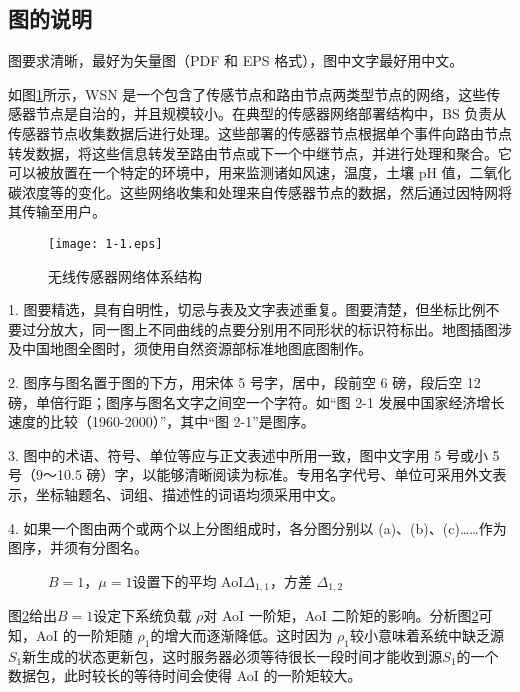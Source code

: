 \subsection{图的说明}

图要求清晰，最好为矢量图（PDF 和 EPS 格式），图中文字最好用中文。

如图\ref{Fig1-1}所示，WSN 是一个包含了传感节点和路由节点两类型节点的网络，这些传感器节点是自治的，并且规模较小。在典型的传感器网络部署结构中，BS 负责从传感器节点收集数据后进行处理。这些部署的传感器节点根据单个事件向路由节点转发数据，将这些信息转发至路由节点或下一个中继节点，并进行处理和聚合。它可以被放置在一个特定的环境中，用来监测诸如风速，温度，土壤 pH 值，二氧化碳浓度等的变化。这些网络收集和处理来自传感器节点的数据，然后通过因特网将其传输至用户。

\begin{figure}[htbp]
\vspace*{6pt}
\centering
\texttt{[image: 1-1.eps]}
\caption{无线传感器网络体系结构}\label{Fig1-1}
\vspace*{10pt}
\end{figure}


\textcolor[rgb]{1.00,0.00,0.00}{1. 图要精选，具有自明性，切忌与表及文字表述重复。图要清楚，但坐标比例不要过分放大，同一图上不同曲线的点要分别用不同形状的标识符标出。地图插图涉及中国地图全图时，须使用自然资源部标准地图底图制作。}

\textcolor[rgb]{1.00,0.00,0.00}{2. 图序与图名置于图的下方，用宋体 5 号字，居中，段前空 6 磅，段后空 12 磅，单倍行距；图序与图名文字之间空一个字符。如“图 2-1 发展中国家经济增长速度的比较（1960-2000）”，其中“图 2-1”是图序。}

\textcolor[rgb]{1.00,0.00,0.00}{3. 图中的术语、符号、单位等应与正文表述中所用一致，图中文字用 5 号或小 5 号（9～10.5 磅）字，以能够清晰阅读为标准。专用名字代号、单位可采用外文表示，坐标轴题名、词组、描述性的词语均须采用中文。}

\textcolor[rgb]{1.00,0.00,0.00}{4. 如果一个图由两个或两个以上分图组成时，各分图分别以 (a)、(b)、(c)……作为图序，并须有分图名。}


\begin{figure}[htbp]
	\vspace*{6pt}
	\centering
	\vspace{1pt}
	\caption{$B = 1$，$\mu  = 1$设置下的平均 AoI${\Delta _{1,1}}$，方差 ${\Delta _{1,2}}$}\label{Fig1-2}
	\vspace*{10pt}
\end{figure}
图\ref{Fig1-2}给出$B = 1$设定下系统负载 $\rho$对 AoI 一阶矩，AoI 二阶矩的影响。分析图\ref{Fig1-2}可知，AoI 的一阶矩随 ${\rho_1}$的增大而逐渐降低。这时因为 ${\rho _1}$较小意味着系统中缺乏源${S_1}$新生成的状态更新包，这时服务器必须等待很长一段时间才能收到源${S_1}$的一个数据包，此时较长的等待时间会使得 AoI 的一阶矩较大。



